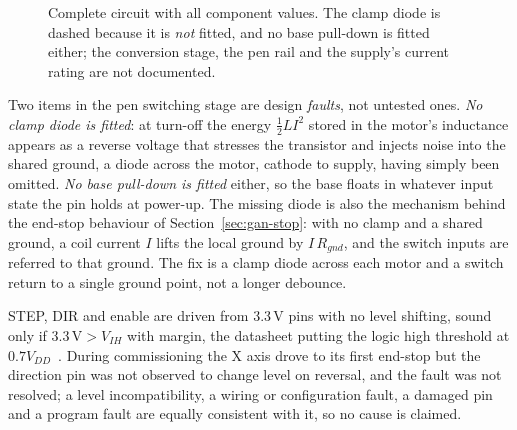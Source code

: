 \begin{figure}[!htbp]
\caption{Complete circuit with all component values. The clamp diode is dashed because it is \emph{not} fitted, and no base pull-down is fitted either; the conversion stage, the pen rail and the supply's current rating are not documented.}
\label{fig:gan-sch}
\end{figure}

Two items in the pen switching stage are design \emph{faults}, not untested ones. \emph{No clamp diode is fitted}: at turn-off the energy $\tfrac12LI^2$ stored in the motor's inductance appears as a reverse voltage that stresses the transistor and injects noise into the shared ground, a diode across the motor, cathode to supply, having simply been omitted. \emph{No base pull-down is fitted} either, so the base floats in whatever input state the pin holds at power-up. The missing diode is also the mechanism behind the end-stop behaviour of Section~\ref{sec:gan-stop}: with no clamp and a shared ground, a coil current $I$ lifts the local ground by $I\,R_{gnd}$, and the switch inputs are referred to that ground. The fix is a clamp diode across each motor and a switch return to a single ground point, not a longer debounce.

STEP, DIR and enable are driven from 3.3\,V pins with no level shifting, sound only if $3.3\,\mathrm{V}>V_{IH}$ with margin, the datasheet putting the logic high threshold at $0.7V_{DD}$~\cite[p.~4]{a4988ds}. During commissioning the X axis drove to its first end-stop but the direction pin was not observed to change level on reversal, and the fault was not resolved; a level incompatibility, a wiring or configuration fault, a damaged pin and a program fault are equally consistent with it, so no cause is claimed.

